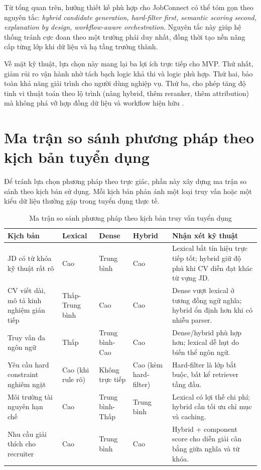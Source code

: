 Từ tổng quan trên, hướng thiết kế phù hợp cho JobConnect có thể tóm gọn theo nguyên tắc: \textit{hybrid candidate generation, hard-filter first, semantic scoring second, explanation by design, workflow-aware orchestration}. Nguyên tắc này giúp hệ thống tránh cực đoan theo một trường phái duy nhất, đồng thời tạo nền nâng cấp từng lớp khi dữ liệu và hạ tầng trưởng thành.

Về mặt kỹ thuật, lựa chọn này mang lại ba lợi ích trực tiếp cho MVP. Thứ nhất, giảm rủi ro vận hành nhờ tách bạch logic khả thi và logic phù hợp. Thứ hai, bảo toàn khả năng giải trình cho người dùng nghiệp vụ. Thứ ba, cho phép tăng độ tinh vi thuật toán theo lộ trình (nâng hybrid, thêm reranker, thêm attribution) mà không phá vỡ hợp đồng dữ liệu và workflow hiện hữu \cite{hld-architecture,hld-api,lld-api,hld-security}.

\section{Ma trận so sánh phương pháp theo kịch bản tuyển dụng}

Để tránh lựa chọn phương pháp theo trực giác, phần này xây dựng ma trận so sánh theo kịch bản sử dụng. Mỗi kịch bản phản ánh một loại truy vấn hoặc một kiểu dữ liệu thường gặp trong tuyển dụng thực tế.

\begin{table}[H]
\caption{Ma trận so sánh phương pháp theo kịch bản truy vấn tuyển dụng}
\centering
\begin{tabularx}{\textwidth}{p{}p{}p{}p{}X}
\toprule
\textbf{Kịch bản} & \textbf{Lexical} & \textbf{Dense} & \textbf{Hybrid} & \textbf{Nhận xét kỹ thuật}\\
\midrule
JD có từ khóa kỹ thuật rất rõ & Cao & Trung bình & Cao & Lexical bắt tín hiệu trực tiếp tốt; hybrid giữ độ phủ khi CV diễn đạt khác từ vựng JD.\\
CV viết dài, mô tả kinh nghiệm gián tiếp & Thấp-Trung bình & Cao & Cao & Dense vượt lexical ở tương đồng ngữ nghĩa; hybrid ổn định hơn khi có nhiễu parser.\\
Truy vấn đa ngôn ngữ & Thấp & Trung bình-Cao & Cao & Dense/hybrid phù hợp hơn; lexical dễ hụt do biến thể ngôn ngữ.\\
Yêu cầu hard constraint nghiêm ngặt & Cao (khi rule rõ) & Không trực tiếp & Cao (kèm hard-filter) & Hard-filter là lớp bắt buộc, bất kể retriever tầng đầu.\\
Môi trường tài nguyên hạn chế & Cao & Trung bình-Thấp & Trung bình & Lexical có lợi thế chi phí; hybrid cần tối ưu chỉ mục và caching.\\
Nhu cầu giải thích cho recruiter & Cao & Trung bình & Cao & Hybrid + component score cho diễn giải cân bằng giữa nghĩa và từ khóa.\\
\bottomrule
\end{tabularx}
\end{table}

